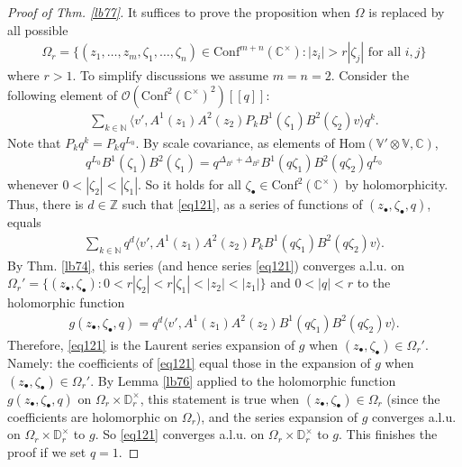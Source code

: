 \documentclass[11pt,b5paper,notitlepage]{article}
\theoremstyle{definition}
\theoremstyle{plain}
\newcommand{\Hom}{\mathrm{Hom}}
\newcommand{\Conf}{\mathrm{Conf}}
\newcommand{\bk}[1]{\langle {#1}\rangle}
\newcommand{\scr}{\mathscr}
\newcommand{\blt}{\bullet}
\newcommand{\Vbb}{\mathbb V}
\newcommand{\Cbb}{\mathbb C}
\newcommand{\Nbb}{\mathbb N}
\newcommand{\Zbb}{\mathbb Z}
\newcommand{\Dbb}{\mathbb D}
\numberwithin{equation}{section}
\begin{document}
\begin{proof}[Proof of Thm. \ref{lb77}]
It suffices to prove the proposition when $\Omega$ is replaced by all possible
\begin{align*}
	\Omega_r=\{(z_1,\dots,z_m,\zeta_1,\dots,\zeta_n)\in\Conf^{m+n}(\Cbb^\times):|z_i|>r|\zeta_j|\text{ for all }i,j\}
\end{align*}
where $r>1$. To simplify discussions we assume $m=n=2$. Consider the following element of $\scr O(\Conf^2(\Cbb^\times)^2)[[q]]$:
\begin{align}
\sum_{k\in\Nbb}\bk{v',A^1(z_1)A^2(z_2)P_kB^1(\zeta_1)B^2(\zeta_2)v}q^k.\label{eq121}
\end{align}
Note that $P_kq^k=P_kq^{L_0}$. By scale covariance, as elements of $\Hom(\Vbb'\otimes\Vbb,\Cbb)$,
\begin{align}
q^{L_0}B^1(\zeta_1)B^2(\zeta_1)=q^{\Delta_{B^1}+\Delta_{B^2}}B^1(q\zeta_1)B^2(q\zeta_2)q^{L_0}	
\end{align}
whenever $0<|\zeta_2|<|\zeta_1|$. So it holds for all $\zeta_\blt\in\Conf^2(\Cbb^\times)$ by holomorphicity. Thus, there is  $d\in\Zbb$ such that \eqref{eq121}, as a series of functions of $(z_\blt,\zeta_\blt,q)$, equals
\begin{align}
\sum_{k\in\Nbb}q^d\bk{v',A^1(z_1)A^2(z_2)P_kB^1(q\zeta_1)B^2(q\zeta_2)v}.	
\end{align}
By Thm. \ref{lb74}, this series (and hence series \eqref{eq121}) converges a.l.u. on $\Omega_r'=\{(z_\blt,\zeta_\blt):0<r|\zeta_2|<r|\zeta_1|<|z_2|<|z_1|\}$ and $0<|q|<r$ to the holomorphic function
\begin{align*}
g(z_\blt,\zeta_\blt,q)=q^d	\bk{v',A^1(z_1)A^2(z_2)B^1(q\zeta_1)B^2(q\zeta_2)v}.
\end{align*}
Therefore, \eqref{eq121} is the Laurent series expansion of $g$ when $(z_\blt,\zeta_\blt)\in\Omega_r'$. Namely: the coefficients of \eqref{eq121} equal those in the expansion of $g$ when $(z_\blt,\zeta_\blt)\in\Omega_r'$. By Lemma \ref{lb76} applied to the holomorphic function $g(z_\blt,\zeta_\blt,q)$ on $\Omega_r\times\Dbb_r^\times$, this statement is true when $(z_\blt,\zeta_\blt)\in\Omega_r$ (since the coefficients are holomorphic on $\Omega_r$), and the series expansion of $g$  converges a.l.u. on $\Omega_r\times\Dbb_r^\times$ to $g$. So \eqref{eq121} converges a.l.u. on $\Omega_r\times\Dbb_r^\times$ to $g$. This finishes the proof if we set $q=1$.
\end{proof}
\end{document}
